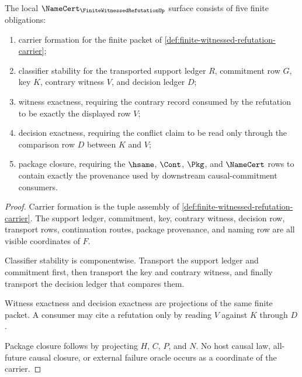 \begin{theorem}
\label{thm:finite-witnessed-refutation-namecert-obligations}
The local $\NameCert_{\FiniteWitnessedRefutationUp}$ surface consists of five finite obligations:
\begin{enumerate}
\item carrier formation for the finite packet of \autoref{def:finite-witnessed-refutation-carrier};
\item classifier stability for the transported support ledger $R$, commitment row $G$, key $K$, contrary witness $V$, and decision ledger $D$;
\item witness exactness, requiring the contrary record consumed by the refutation to be exactly the displayed row $V$;
\item decision exactness, requiring the conflict claim to be read only through the comparison row $D$ between $K$ and $V$;
\item package closure, requiring the $\hsame$, $\Cont$, $\Pkg$, and $\NameCert$ rows to contain exactly the provenance used by downstream causal-commitment consumers.
\end{enumerate}
\end{theorem}
\begin{proof}
Carrier formation is the tuple assembly of \autoref{def:finite-witnessed-refutation-carrier}. The support ledger, commitment, key, contrary witness, decision row, transport rows, continuation routes, package provenance, and naming row are all visible coordinates of $F$.

Classifier stability is componentwise. Transport the support ledger and commitment first, then transport the key and contrary witness, and finally transport the decision ledger that compares them.

Witness exactness and decision exactness are projections of the same finite packet. A consumer may cite a refutation only by reading $V$ against $K$ through $D$.

Package closure follows by projecting $H$, $C$, $P$, and $N$. No host causal law, all-future causal closure, or external failure oracle occurs as a coordinate of the carrier.
\end{proof}

